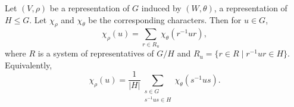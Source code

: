 Let $(V, \rho)$ be a representation of $G$ induced by $(W, \theta)$, a representation of $H \leq G$. Let $\chi_\rho$ and $\chi_\theta$ be the corresponding characters. Then for $u \in G$,
$$\chi_\rho(u) = \sum_{r \in R_u} \chi_\theta(r^{-1}ur),$$
where $R$ is a system of representatives of $G/H$ and $R_u = \{ r \in R \mid r^{-1}ur \in H \}$. Equivalently,
$$\chi_\rho(u) = \frac{1}{|H|} \sum_{\substack{s \in G \\ s^{-1}us \in H}} \chi_\theta(s^{-1}us).$$

